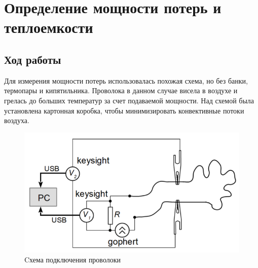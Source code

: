 \documentclass[a4paper,14pt]{extarticle}
\begin{document}
	\section{Определение мощности потерь и теплоемкости}
		\subsection{Ход работы}
			Для измерения мощности потерь использовалась похожая схема, но без банки, термопары и кипятильника. Проволока в данном случае висела в воздухе и грелась до больших температур за счет подаваемой мощности. Над схемой была установлена картонная коробка, чтобы минимизировать конвективные потоки воздуха.
			\begin{figure}[h!]
				\centering
				\includegraphics[width=.40\linewidth]{Lab3_5.png}
				\caption{Cхема подключения проволоки}
				\label{fig5}
			\end{figure}
\end{document}

